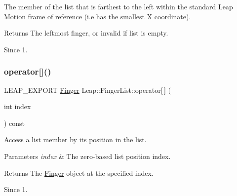 The member of the list that is farthest to the left within the standard Leap Motion frame of reference (i.\+e has the smallest X coordinate).


\begin{DoxyCodeInclude}
\end{DoxyCodeInclude}


\begin{DoxyReturn}{Returns}
The leftmost finger, or invalid if list is empty. 
\end{DoxyReturn}
\begin{DoxySince}{Since}
1. 
\end{DoxySince}
\mbox{\label{class_leap_1_1_finger_list_a64a8580ef7401081c1d18f11cd285764}} 
\subsubsection{\texorpdfstring{operator[]()}{operator[]()}}
{\footnotesize\ttfamily L\+E\+A\+P\+\_\+\+E\+X\+P\+O\+RT \hyperlink{class_leap_1_1_finger}{Finger} Leap\+::\+Finger\+List\+::operator\mbox{[}$\,$\mbox{]} (\begin{DoxyParamCaption}\item[{int}]{index }\end{DoxyParamCaption}) const}

Access a list member by its position in the list.


\begin{DoxyCodeInclude}
\end{DoxyCodeInclude}



\begin{DoxyParams}{Parameters}
{\em index} & The zero-\/based list position index. \\
\hline
\end{DoxyParams}
\begin{DoxyReturn}{Returns}
The \hyperlink{class_leap_1_1_finger}{Finger} object at the specified index. 
\end{DoxyReturn}
\begin{DoxySince}{Since}
1. 
\end{DoxySince}
\mbox{\label{class_leap_1_1_finger_list_acb8b16de09fd0751d395ce7580fc28ff}} 
